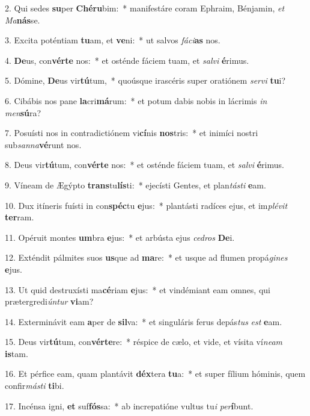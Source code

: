 2. Qui sedes \textbf{su}per \textbf{Ché}\textbf{ru}bim:~*  manifestáre coram Ephraim, Bénjamin, \textit{et} \textit{Ma}\textbf{nás}se.\

3. Excita poténtiam \textbf{tu}am, et \textbf{ve}ni:~*  ut salvos \textit{fá}\textit{ci}\textbf{as} nos.\

4. \textbf{De}us, con\textbf{vér}\textbf{te} nos:~*  et osténde fáciem tuam, et \textit{sal}\textit{vi} \textbf{é}rimus.\

5. Dómine, \textbf{De}us vir\textbf{tú}tum,~*  quoúsque irascéris super oratiónem \textit{ser}\textit{vi} \textbf{tu}i?\

6. Cibábis nos pane \textbf{la}cri\textbf{má}rum:~*  et potum dabis nobis in lácrimis \textit{in} \textit{men}\textbf{sú}ra?\

7. Posuísti nos in contradictiónem vi\textbf{cí}nis \textbf{nos}tris:~*  et inimíci nostri sub\textit{san}\textit{na}\textbf{vé}runt nos.\

8. Deus vir\textbf{tú}tum, con\textbf{vér}\textbf{te} nos:~*  et osténde fáciem tuam, et \textit{sal}\textit{vi} \textbf{é}rimus.\

9. Víneam de Ægýpto \textbf{trans}tu\textbf{lís}ti:~*  ejecísti Gentes, et plan\textit{tás}\textit{ti} \textbf{e}am.\

10. Dux itíneris fuísti in con\textbf{spéc}tu \textbf{e}jus:~*  plantásti radíces ejus, et im\textit{plé}\textit{vit} \textbf{ter}ram.\

11. Opéruit montes \textbf{um}bra \textbf{e}jus:~*  et arbústa ejus \textit{ce}\textit{dros} \textbf{De}i.\

12. Exténdit pálmites suos \textbf{us}que ad \textbf{ma}re:~*  et usque ad flumen propá\textit{gi}\textit{nes} \textbf{e}jus.\

13. Ut quid destruxísti ma\textbf{cé}riam \textbf{e}jus:~*  et vindémiant eam omnes, qui prætergredi\textit{ún}\textit{tur} \textbf{vi}am?\

14. Exterminávit eam \textbf{a}per de \textbf{sil}va:~*  et singuláris ferus depás\textit{tus} \textit{est} \textbf{e}am.\

15. Deus vir\textbf{tú}tum, con\textbf{vér}\textbf{te}re:~*  réspice de cælo, et vide, et vísita ví\textit{ne}\textit{am} \textbf{is}tam.\

16. Et pérfice eam, quam plantávit \textbf{déx}tera \textbf{tu}a:~*  et super fílium hóminis, quem confir\textit{más}\textit{ti} \textbf{ti}bi.\

17. Incénsa igni, \textbf{et} suf\textbf{fós}sa:~*  ab increpatióne vultus tu\textit{i} \textit{per}\textbf{í}bunt.\

